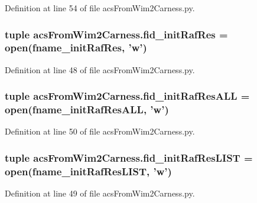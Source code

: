 Definition at line 54 of file acs\-From\-Wim2\-Carness.\-py.

\hypertarget{a00100_a2f9cfe05abfed3ab6326d0cb094c7c80}{
\subsubsection[{fid\-\_\-init\-Raf\-Res}]{\setlength{\rightskip}{0pt plus 5cm}tuple acs\-From\-Wim2\-Carness.\-fid\-\_\-init\-Raf\-Res = open({\bf fname\-\_\-init\-Raf\-Res}, 'w')}}\label{a00100_a2f9cfe05abfed3ab6326d0cb094c7c80}


Definition at line 48 of file acs\-From\-Wim2\-Carness.\-py.

\hypertarget{a00100_add1c3bb75f1d98889c27099fc14fc6a8}{
\subsubsection[{fid\-\_\-init\-Raf\-Res\-A\-L\-L}]{\setlength{\rightskip}{0pt plus 5cm}tuple acs\-From\-Wim2\-Carness.\-fid\-\_\-init\-Raf\-Res\-A\-L\-L = open({\bf fname\-\_\-init\-Raf\-Res\-A\-L\-L}, 'w')}}\label{a00100_add1c3bb75f1d98889c27099fc14fc6a8}


Definition at line 50 of file acs\-From\-Wim2\-Carness.\-py.

\hypertarget{a00100_a7af2668de12720f3c7925527002d81b0}{
\subsubsection[{fid\-\_\-init\-Raf\-Res\-L\-I\-S\-T}]{\setlength{\rightskip}{0pt plus 5cm}tuple acs\-From\-Wim2\-Carness.\-fid\-\_\-init\-Raf\-Res\-L\-I\-S\-T = open({\bf fname\-\_\-init\-Raf\-Res\-L\-I\-S\-T}, 'w')}}\label{a00100_a7af2668de12720f3c7925527002d81b0}


Definition at line 49 of file acs\-From\-Wim2\-Carness.\-py.

